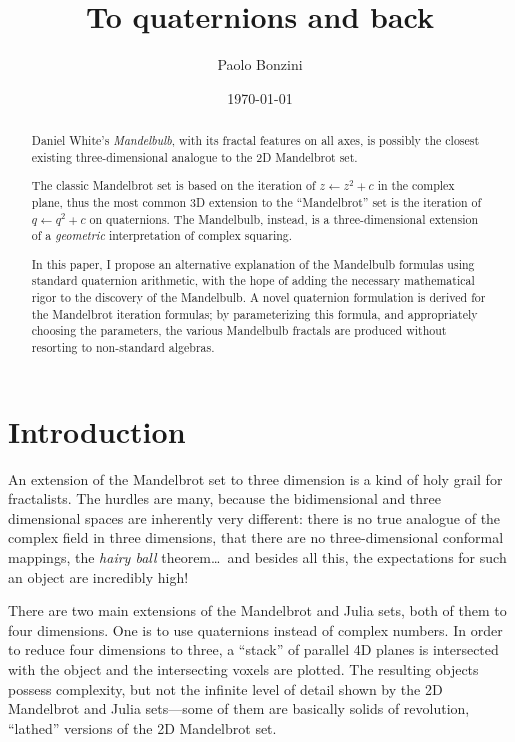 \documentclass{article}
\title{To quaternions and back}
\date{\today}
\author{Paolo Bonzini}
\begin{document}
\maketitle


\begin{abstract}
  Daniel White's \emph{Mandelbulb}, with its fractal features on all axes,
  is possibly the closest existing three-dimensional analogue to the 2D
  Mandelbrot set.

  The classic Mandelbrot set is based on the iteration of $z\leftarrow
  z^2+c$ in the complex plane, thus the most common 3D extension
  to the ``Mandelbrot'' set is the iteration of $q\leftarrow q^2+c$
  on quaternions.  The Mandelbulb, instead, is a three-dimensional
  extension of a \emph{geometric} interpretation of complex squaring.

  In this paper, I propose an alternative explanation of the Mandelbulb
  formulas using standard quaternion arithmetic, with the hope of adding
  the necessary mathematical rigor to the discovery of the Mandelbulb.
  A novel quaternion formulation is derived for the Mandelbrot iteration
  formulas; by parameterizing this formula, and appropriately choosing
  the parameters, the various Mandelbulb fractals are produced without
  resorting to non-standard algebras.
\end{abstract}

\section{Introduction}

An extension of the Mandelbrot set to three dimension is a kind of
holy grail for fractalists.  The hurdles are many, because the
bidimensional and three dimensional spaces are inherently very
different: there is no true analogue of the complex field in three
dimensions, that there are no three-dimensional conformal mappings,
the \emph{hairy ball} theorem\dots\ and besides all this, the
expectations for such an object are incredibly high!

There are two main extensions of the Mandelbrot and Julia sets, both
of them to four dimensions.  One is to use quaternions instead of
complex numbers.  In order to reduce four dimensions to three, a
``stack'' of parallel 4D planes is intersected with the object and the
intersecting voxels are plotted.  The resulting objects possess
complexity, but not the infinite level of detail shown by the 2D
Mandelbrot and Julia sets---some of them are basically solids of
revolution, ``lathed'' versions of the 2D Mandelbrot set.
\end{document}

